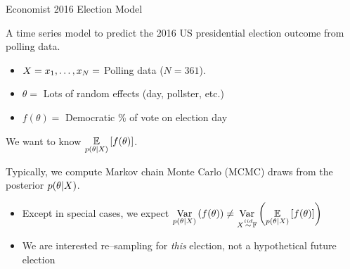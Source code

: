 


\begin{frame}{Economist 2016 Election Model \citep{economist:2020:election}}

\begin{minipage}[t]{0.35\textwidth}
    \ElectionData{}
\end{minipage}
\begin{minipage}{0.04\textwidth}
\hfill
\end{minipage}
\begin{minipage}[t]{0.59\textwidth}

A time series model to predict the 2016 US presidential election
outcome from polling data.

\spskip
\begin{itemize}
\item $X = x_1, \ldots, x_N =$ Polling data ($N = 361$).
\item $\theta = $ Lots of random effects (day, pollster, etc.)
\item $f(\theta) = $ Democratic \% of vote on election day
\end{itemize}

\spskip
We want to know $\underset{p(\theta \vert X)}{\mathbb{E}}\left[f(\theta)\right]$.

\spskip
Typically, we compute Markov chain Monte Carlo (MCMC) draws from the
posterior $p(\theta \vert X)$.


\end{minipage}


\pause
{}

\pause
%
\begin{itemize}
\item Except in special cases, we expect 
    $\underset{p(\theta \vert X)}{\mathrm{Var}}\left(f(\theta)\right) \ne \underset{X\overset{iid}{\sim}\mathbb{F}}{\mathrm{Var}}\left(\underset{p(\theta \vert X)}{\mathbb{E}}\left[f(\theta)\right]\right)$
\item We are interested re--sampling for \textit{this} election, not a hypothetical future election
\end{itemize}
%


\end{frame}

